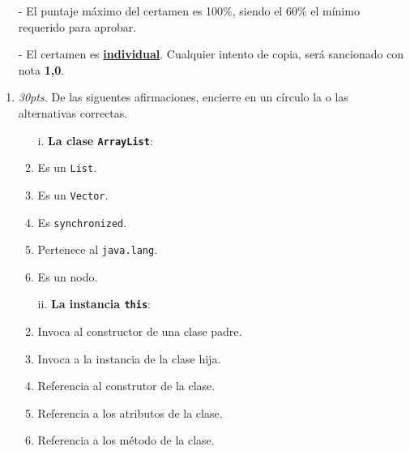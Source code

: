 \documentclass[10pt]{article}
\begin{document}
	{\scriptsize
	\begin{itemize}
		\item[-] El puntaje m\'aximo del certamen es 100\%, siendo el 60\% el m\'inimo requerido para aprobar.
		\item[-] El certamen es \underline{\textbf{individual}}. Cualquier intento de copia, ser\'a sancionado con nota \textbf{1,0}.
	\end{itemize}
	
	\vspace*{-20pt}

	\begin{enumerate}

		\item \emph{30pts.} De las siguentes afirmaciones, encierre en un c\'irculo la o las alternativas correctas.
		
		\begin{multicols}{2}

			\begin{enumerate}[label=(\alph*)]
                \item[i.] \textbf{La clase \texttt{ArrayList}}:
                \item Es un \texttt{List}.
				 \item Es un \texttt{Vector}.
				 \item Es \texttt{synchronized}.
				 \item Pertenece al \texttt{java.lang}.
				 \item Es un nodo.
			\end{enumerate}

			\begin{enumerate}[label=(\alph*)]
                \item[ii.] \textbf{La instancia \texttt{this}}:
                \item Invoca al constructor de una clase padre.
    			 \item Invoca a la instancia de la clase hija.
				 \item Referencia al construtor de la clase.
				 \item Referencia a los atributos de la clase.
				 \item Referencia a los m\'etodo de la clase.
			\end{enumerate}


\end{multicols}
\end{enumerate}}
\end{document}

